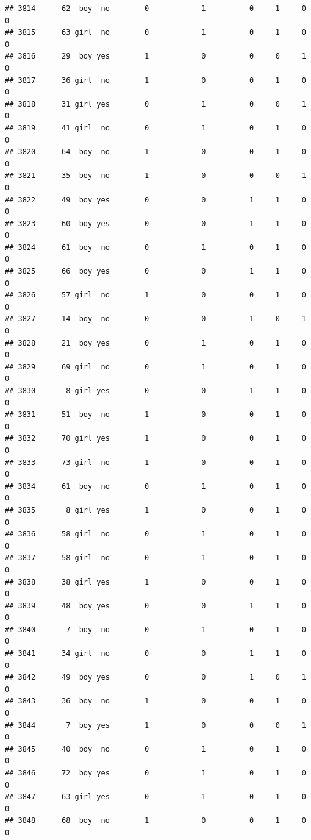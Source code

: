 \documentclass[man]{apa6}
\begin{document}
\begin{verbatim}
## 3814      62  boy  no        0            1          0     1     0     0
## 3815      63 girl  no        0            1          0     1     0     0
## 3816      29  boy yes        1            0          0     0     1     0
## 3817      36 girl  no        1            0          0     1     0     0
## 3818      31 girl yes        0            1          0     0     1     0
## 3819      41 girl  no        0            1          0     1     0     0
## 3820      64  boy  no        1            0          0     1     0     0
## 3821      35  boy  no        1            0          0     0     1     0
## 3822      49  boy yes        0            0          1     1     0     0
## 3823      60  boy yes        0            0          1     1     0     0
## 3824      61  boy  no        0            1          0     1     0     0
## 3825      66  boy yes        0            0          1     1     0     0
## 3826      57 girl  no        1            0          0     1     0     0
## 3827      14  boy  no        0            0          1     0     1     0
## 3828      21  boy yes        0            1          0     1     0     0
## 3829      69 girl  no        0            1          0     1     0     0
## 3830       8 girl yes        0            0          1     1     0     0
## 3831      51  boy  no        1            0          0     1     0     0
## 3832      70 girl yes        1            0          0     1     0     0
## 3833      73 girl  no        1            0          0     1     0     0
## 3834      61  boy  no        0            1          0     1     0     0
## 3835       8 girl yes        1            0          0     1     0     0
## 3836      58 girl  no        0            1          0     1     0     0
## 3837      58 girl  no        0            1          0     1     0     0
## 3838      38 girl yes        1            0          0     1     0     0
## 3839      48  boy yes        0            0          1     1     0     0
## 3840       7  boy  no        0            1          0     1     0     0
## 3841      34 girl  no        0            0          1     1     0     0
## 3842      49  boy yes        0            0          1     0     1     0
## 3843      36  boy  no        1            0          0     1     0     0
## 3844       7  boy yes        1            0          0     0     1     0
## 3845      40  boy  no        0            1          0     1     0     0
## 3846      72  boy yes        0            1          0     1     0     0
## 3847      63 girl yes        0            1          0     1     0     0
## 3848      68  boy  no        1            0          0     1     0     0

\end{verbatim}
\end{document}
